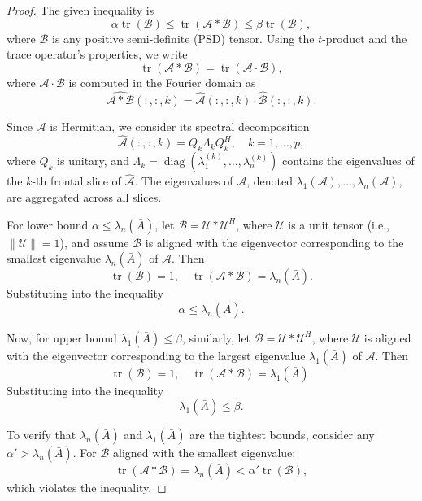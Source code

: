 \documentclass[10pt,a4paper]{amsart}
\begin{document}
\begin{proof}
    The given inequality is
    \[
    \alpha \operatorname{tr}(\mathcal{B}) \leq \operatorname{tr}(\mathcal{A} * \mathcal{B}) \leq \beta \operatorname{tr}(\mathcal{B}),
    \]
    where $\mathcal{B}$ is any positive semi-definite (PSD) tensor. Using the $t$-product and the trace operator's properties, we write
    \[
    \operatorname{tr}(\mathcal{A} * \mathcal{B}) = \operatorname{tr}(\mathcal{A} \cdot \mathcal{B}),
    \]
    where $\mathcal{A} \cdot \mathcal{B}$ is computed in the Fourier domain as
    \[
    \widehat{\mathcal{A} * \mathcal{B}}(:, :, k) = \widehat{\mathcal{A}}(:, :, k) \cdot \widehat{\mathcal{B}}(:, :, k).
    \]

   \noindent Since $\mathcal{A}$ is Hermitian, we consider its spectral decomposition
    \[
    \widehat{\mathcal{A}}(:, :, k) = Q_k \Lambda_k Q_k^H, \quad k = 1, \ldots, p,
    \]
    where $Q_k$ is unitary, and $\Lambda_k = \operatorname{diag}(\lambda_1^{(k)}, \ldots, \lambda_n^{(k)})$ contains the eigenvalues of the $k$-th frontal slice of $\widehat{\mathcal{A}}$. The eigenvalues of $\mathcal{A}$, denoted $\lambda_1(\mathcal{A}), \ldots, \lambda_n(\mathcal{A})$, are aggregated across all slices.

  \noindent For lower bound $\alpha \leq \lambda_n(\bar{A})$,
    let $\mathcal{B} = \mathcal{U}*\mathcal{U}^H$, where $\mathcal{U}$ is a unit tensor (i.e., $\|\mathcal{U}\| = 1$), and assume $\mathcal{B}$ is aligned with the eigenvector corresponding to the smallest eigenvalue $\lambda_n(\bar{A})$ of $\mathcal{A}$. Then
    \[
    \operatorname{tr}(\mathcal{B}) = 1, \quad \operatorname{tr}(\mathcal{A} * \mathcal{B}) = \lambda_n(\bar{A}).
    \]
    Substituting into the inequality
    \[
    \alpha \leq \lambda_n(\bar{A}).
    \]

  \noindent Now, for upper bound $\lambda_1(\bar{A}) \leq \beta$,  
    similarly, let $\mathcal{B} = \mathcal{U}*\mathcal{U}^H$, where $\mathcal{U}$ is aligned with the eigenvector corresponding to the largest eigenvalue $\lambda_1(\bar{A})$ of $\mathcal{A}$. Then
    \[
    \operatorname{tr}(\mathcal{B}) = 1, \quad \operatorname{tr}(\mathcal{A} * \mathcal{B}) = \lambda_1(\bar{A}).
    \]
    Substituting into the inequality
    \[
    \lambda_1(\bar{A}) \leq \beta.
    \]
 
   \noindent To verify that $\lambda_n(\bar{A})$ and $\lambda_1(\bar{A})$ are the tightest bounds, consider any $\alpha' > \lambda_n(\bar{A})$. For $\mathcal{B}$ aligned with the smallest eigenvalue:
    \[
    \operatorname{tr}(\mathcal{A} * \mathcal{B}) = \lambda_n(\bar{A}) < \alpha' \operatorname{tr}(\mathcal{B}),
    \]
    which violates the inequality.


\end{proof}
\end{document}
